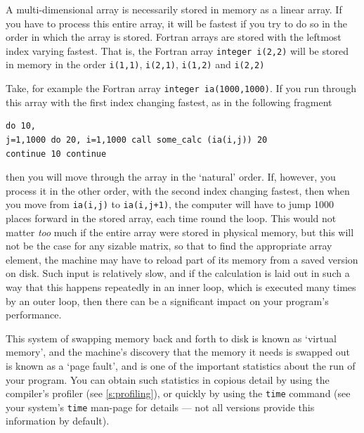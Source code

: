 \documentclass[11pt,oneside,chapters]{starlink}
\begin{document}
A multi-dimensional array is necessarily stored in
memory as a linear array.  If you have to process this
entire array, it will be fastest if you try to do so in
the order in which the array is stored.  Fortran arrays
are stored with the leftmost index varying fastest.
That is, the Fortran array \texttt{integer i(2,2)}
will be stored in memory in the order
\texttt{i(1,1)}, 
\texttt{i(2,1)},
\texttt{i(1,2)} and
\texttt{i(2,2)}

Take,
for example the Fortran array \texttt{integer ia(1000,1000)}.
If you run through this array
with the first index changing fastest, as in the
following fragment

\begin{verbatim}
do 10,
j=1,1000 do 20, i=1,1000 call some_calc (ia(i,j)) 20
continue 10 continue
\end{verbatim}

then
you will move through the array in the `natural' order.
If, however, you process it in the other order, with the
second index changing fastest, then when you move from
\texttt{ia(i,j)} to \texttt{ia(i,j+1)}, the
computer will have to jump 1000 places forward in the
stored array, each time round the loop.  This would not
matter \emph{too} much if the entire array were stored
in physical memory, but this will not be the case for
any sizable matrix, so that to find the appropriate
array element, the machine may have to reload part of
its memory from a saved version on disk.  Such input is
relatively slow, and if the calculation is laid out in
such a way that this happens repeatedly in an inner
loop, which is executed many times by an outer loop,
then there can be a significant impact on your program's
performance.

This system of swapping memory back
and forth to disk is known as `virtual memory', and the
machine's discovery that the memory it needs is swapped
out is known as a `page fault', and is one of the
important statistics about the run of your program.  You
can obtain such statistics in copious detail by using
the compiler's profiler (see \ref{s:profiling}),
or quickly by using the \texttt{time} command (see
your system's \texttt{time} man-page for details ---
not all versions provide this information by default).
\end{document}
